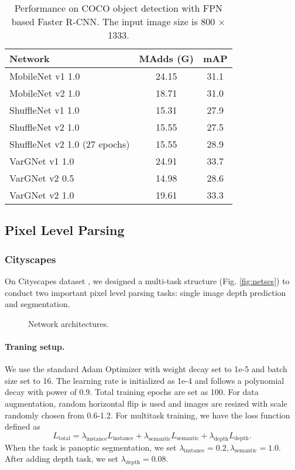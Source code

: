 \documentclass{article}
\begin{document}
\begin{table}
  \centering
  \caption{Performance on COCO object detection with FPN based Faster R-CNN. The input image size is 800 $\times$ 1333.}\label{tab:det2}
  \begin{tabular}{lcc}
  \toprule
  Network & MAdds (G) & mAP \\ \midrule
  MobileNet v1 1.0 & 24.15 & 31.1 \\  
  MobileNet v2 1.0 & 18.71 & 31.0 \\ \midrule
  ShuffleNet v1 1.0 & 15.31 & 27.9 \\  
  ShuffleNet v2 1.0 & 15.55 & 27.5 \\ 
  ShuffleNet v2 1.0 (27 epochs) & 15.55 & 28.9 \\ 
  \midrule
  VarGNet v1 1.0 & 24.91 & 33.7 \\  
VarGNet v2 0.5 & 14.98 & 28.6 \\ 
  VarGNet v2 1.0 & 19.61 & 33.3 \\ \bottomrule
  \end{tabular}
\end{table}

\subsection{Pixel Level Parsing}

\subsubsection{Cityscapes}
On Cityscapes dataset \cite{cordts2016cityscapes}, we designed a multi-task structure (Fig. \ref{fig:netscs}) to conduct two important pixel level parsing tasks: single image depth prediction and segmentation. 
\begin{figure}
  \centering
   \hfill
  \caption{Network architectures.} \label{fig:nets}
\end{figure}

\paragraph{Traning setup.} We use the standard Adam Optimizer with weight decay set to 1e-5 and batch size set to 16. The learning rate is initialized as 1e-4 and follows a polynomial decay with power of 0.9. Total training epochs are set as 100. For data augmentation, random horizontal flip is used and images are resized with scale randomly chosen from 0.6-1.2.
For multitask training, we have the loss function defined as
\[
L_{\mathrm{total}}=\lambda_{\mathrm{instance}} L_{\mathrm{instance}}+\lambda_{\mathrm{semantic}} L_{\mathrm{semantic}}+\lambda_{\mathrm{depth}} L_{\mathrm{depth}}.
\]
When the task is panoptic segmentation, we set $\lambda_{\mathrm{instance}}=0.2, \lambda_{\mathrm{semantic}}=1.0$. After adding depth task, we set $\lambda_{\mathrm{depth}}=0.08$.
\end{document}
